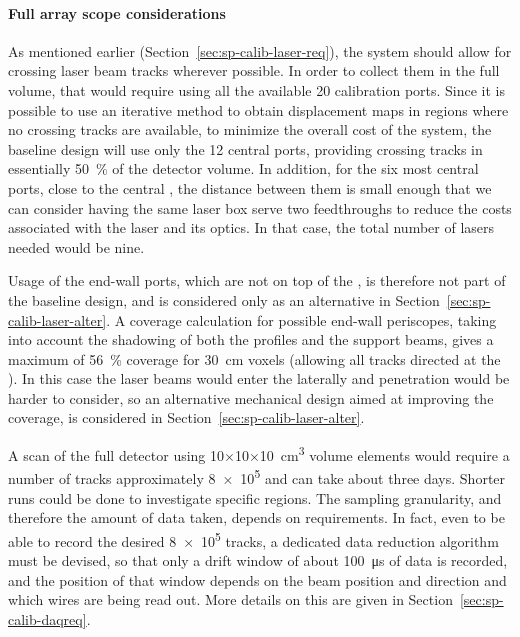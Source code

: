 \paragraph{Full array scope considerations}

As mentioned earlier (Section~\ref{sec:sp-calib-laser-req}), the system should allow for crossing laser beam tracks wherever possible. In order to %
collect them in the full  volume, that would require using all the available \num{20} calibration ports. Since it is possible to use an iterative method to obtain displacement maps in regions where no crossing tracks are available, 
to minimize the overall cost of the system, the baseline design will use only the \num{12} central ports, providing crossing tracks in essentially \SI{50}{\%} of the detector volume. 
In addition, for the six most central ports, close to the central , the distance between them is small enough that we can consider having the same laser box serve two feedthroughs to reduce the costs associated with the laser and its optics. In that case, the total number of lasers needed would be nine.

Usage of the end-wall ports, which are not %
on top of the , is therefore not part of the baseline design, and is considered only as an alternative in Section~\ref{sec:sp-calib-laser-alter}. A coverage calculation for possible end-wall periscopes, taking into account the shadowing of both the  profiles and the support beams, gives a maximum of \SI{56}{\%} coverage for \SI{30}{\cm} voxels (allowing all tracks directed at the ). In this case the laser beams would enter the  laterally and  penetration would be harder to consider, so an alternative mechanical design aimed at improving the coverage, is considered in Section~\ref{sec:sp-calib-laser-alter}.



A scan of the full detector using \num{10}$\times$\num{10}$\times$\SI{10}{\cubic\cm}
volume elements would require a number of tracks approximately \num{8e5} 
and can take about three days. Shorter runs could be done to investigate specific regions. The sampling granularity, and therefore the amount of data taken, depends on  requirements. In fact, even to be able to record the desired \num{8e5} tracks, a dedicated data reduction algorithm must be devised, so that only a drift window of about \SI{100}{\micro\s}
of data is recorded, and the position of that window depends on the beam position and direction and which wires are being read out. More details on this are given in Section~\ref{sec:sp-calib-daqreq}.

